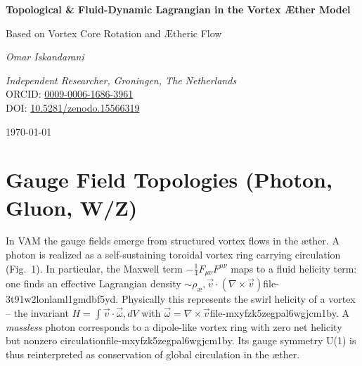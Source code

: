 \documentclass[a4paper,12pt]{article}
\begin{document}
    \begin{titlepage}
        \thispagestyle{empty}
        \centering
        \vspace*{2cm}
        {\Huge\bfseries Topological \& Fluid-Dynamic Lagrangian in the Vortex Æther Model \par}
        \vspace{0.5cm}
        {\Large Based on Vortex Core Rotation and Ætheric Flow \par}
        \vspace{2cm}
        {\Large\itshape Omar Iskandarani\par}
        \vspace{0.5cm}
        \textit{Independent Researcher, Groningen, The Netherlands} \\
        ORCID: \href{https://orcid.org/0009-0006-1686-3961}{0009-0006-1686-3961} \\
        DOI: \href{https://doi.org/10.5281/zenodo.15566319}{10.5281/zenodo.15566319} \\
        \vfill
        {\large \today\par}


        \begin{abstract}
            This document presents a Lagrangian formulation for the Vortex Æther Model (VAM), focusing on the topological and fluid-dynamic aspects of particle interactions. It introduces a path-integral approach to quantize vorticity, linking it to gauge theory and relativity corrections. The model posits that particles like electrons and protons are represented as vortex knots in an incompressible æther, with their dynamics governed by a Lagrangian that incorporates both topological stability and fluid flow characteristics.
        \end{abstract}

    \end{titlepage}

    \newpage

\chapter*{Gauge Field Topologies (Photon, Gluon, W/Z)}

In VAM the gauge fields emerge from structured vortex flows in the æther.  A photon is realized as a self-sustaining toroidal vortex ring carrying circulation (Fig. 1).  In particular, the Maxwell term $-\tfrac14 F_{\mu\nu}F^{\mu\nu}$ maps to a fluid helicity term: one finds an effective Lagrangian density $\sim\rho_{æ},\vec{v}\cdot(\nabla\times \vec{v})$file-3t91w2lonlaml1gmdbf5yd.  Physically this represents the swirl helicity of a vortex – the invariant $H=\int \vec{v}\cdot\vec{\omega},dV$ with $\vec{\omega}=\nabla\times\vec{v}$file-mxyfzk5zegpal6wgjcm1by.  A \textit{massless} photon corresponds to a dipole-like vortex ring with zero net helicity but nonzero circulationfile-mxyfzk5zegpal6wgjcm1by.  Its gauge symmetry U(1) is thus reinterpreted as conservation of global circulation in the æther.
\end{document}
